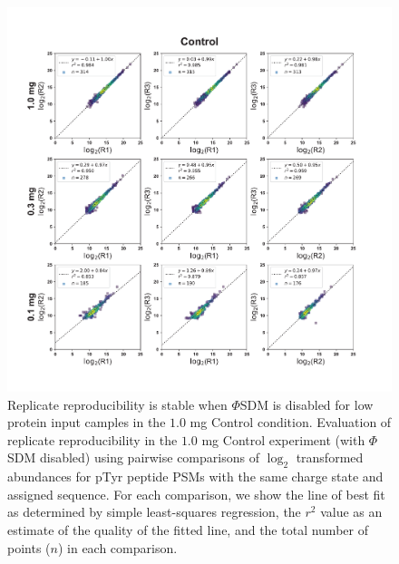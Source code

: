 \documentclass[journal=jprobs,manuscript=article]{achemso}
\begin{document}
\begin{figure}[t!]
\centering
\includegraphics[width=175mm]{figures/supplements/control_replicate_reprod.pdf}
\caption{Replicate reproducibility is stable when $\Phi$SDM is disabled for low protein input camples in the $1.0$ mg Control condition. Evaluation of replicate reproducibility in the $1.0$ mg Control experiment (with $\Phi$SDM disabled) using pairwise comparisons of $\log_2$ transformed abundances for  pTyr peptide PSMs with the same charge state and assigned sequence. For each comparison, we show the line of best fit as determined by simple least-squares regression\cite{grus2019data}, the $r^2$ value as an estimate of the quality of the fitted line, and the total number of points ($n$) in each comparison. }\label{control_replicate_reprod}
\end{figure}

\clearpage
\end{document}
